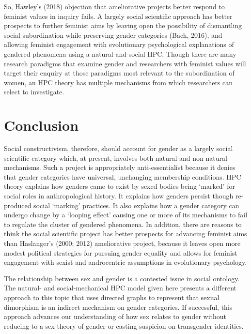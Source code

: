 So, Hawley's (2018) objection that ameliorative projects better respond
to feminist values in inquiry fails. A largely social scientific
approach has better prospects to further feminist aims by leaving open
the possibility of dismantling social subordination while preserving
gender categories (Bach, 2016), and allowing feminist engagement with
evolutionary psychological explanations of gendered phenomena using a
natural-and-social HPC. Though there are many research paradigms that
examine gender and researchers with feminist values will target their
enquiry at those paradigms most relevant to the subordination of women,
an HPC theory has multiple mechanisms from which researchers can select
to investigate.

\section*{Conclusion}

Social constructivism, therefore, should account for gender as a largely
social scientific category which, at present, involves both natural and
non-natural mechanisms. Such a project is appropriately
anti-essentialist because it denies that gender categories have
universal, unchanging membership conditions. HPC theory explains how
genders came to exist by sexed bodies being `marked' for social roles in
anthropological history. It explains how genders persist though
re-produced social `marking' practices. It also explains how a gender
category can undergo change by a `looping effect' causing one or more of
its mechanisms to fail to regulate the cluster of gendered phenomena. In
addition, there are reasons to think the social scientific project has
better prospects for advancing feminist aims than Haslanger's (2000;
2012) ameliorative project, because it leaves open more modest political
strategies for pursuing gender equality and allows for feminist
engagement with sexist and androcentric assumptions in evolutionary
psychology.

The relationship between sex and gender is a contested issue in social
ontology. The natural- and social-mechanical HPC model given here
presents a different approach to this topic that uses directed graphs to
represent that sexual dimorphism is an indirect mechanism on gender
categories. If successful, this approach advances our understanding of
how sex relates to gender without reducing to a sex theory of gender or
casting suspicion on transgender identities.


